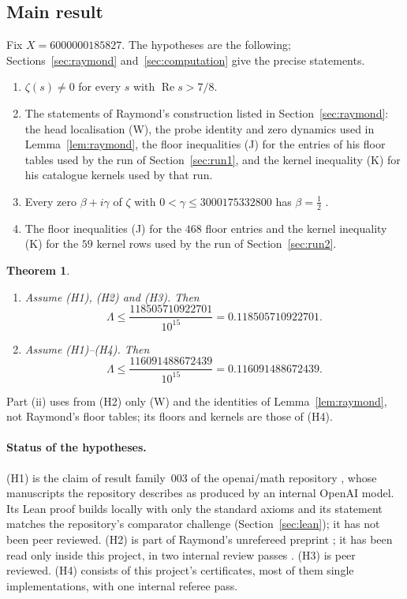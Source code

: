 \documentclass[11pt]{article}
\newtheorem{theorem}{Theorem}[section]
\theoremstyle{definition}
\newcommand{\LB}{\Lambda}
\DeclareMathOperator{\Rea}{Re}
\begin{document}
\subsection{Main result}\label{sec:main}

Fix $X=6000000185827$. The hypotheses are the following; Sections~\ref{sec:raymond}
and~\ref{sec:computation} give the precise statements.

\begin{enumerate}[leftmargin=3.2em]
\item[\textbf{(H1)}] $\zeta(s)\ne0$ for every $s$ with $\Rea s>7/8$.
\item[\textbf{(H2)}] The statements of Raymond's construction \cite{Raymond26} listed in
Section~\ref{sec:raymond}: the head localisation (W), the probe identity and zero
dynamics used in Lemma~\ref{lem:raymond}, the floor inequalities (J) for the entries of
his floor tables used by the run of Section~\ref{sec:run1}, and the kernel inequality (K)
for his catalogue kernels used by that run.
\item[\textbf{(H3)}] Every zero $\beta+i\gamma$ of $\zeta$ with $0<\gamma\le3000175332800$
has $\beta=\frac12$ \cite[Theorem~1]{PlattTrudgian21}.
\item[\textbf{(H4)}] The floor inequalities (J) for the $468$ floor entries and the kernel
inequality (K) for the $59$ kernel rows used by the run of Section~\ref{sec:run2}.
\end{enumerate}

\begin{theorem}\label{thm:main}
\begin{enumerate}[label=\textup{(\roman*)},leftmargin=2.2em]
\item Assume \textup{(H1)}, \textup{(H2)} and \textup{(H3)}. Then
\[
\LB\le\frac{118505710922701}{10^{15}}=0.118505710922701 .
\]
\item Assume \textup{(H1)}--\textup{(H4)}. Then
\[
\LB\le\frac{116091488672439}{10^{15}}=0.116091488672439 .
\]
\end{enumerate}
\end{theorem}

Part (ii) uses from (H2) only (W) and the identities of Lemma~\ref{lem:raymond}, not
Raymond's floor tables; its floors and kernels are those of (H4).

\paragraph{Status of the hypotheses.}
(H1) is the claim of result family~003 of the openai/math repository
\cite{OpenAI26QRH}, whose manuscripts the repository describes as produced by an
internal OpenAI model. Its Lean proof builds locally with only the standard axioms and
its statement matches the repository's comparator challenge
(Section~\ref{sec:lean}); it has not been peer reviewed. (H2) is part of Raymond's
unrefereed preprint \cite{Raymond26}; it has been read only inside this project, in two
internal review passes \cite{IntReviewA,IntReviewB}. (H3) is peer reviewed. (H4)
consists of this project's certificates, most of them single implementations, with one
internal referee pass.
\end{document}

